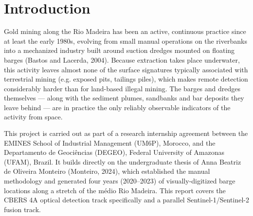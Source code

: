 \documentclass[11pt,a4paper]{article}
\begin{document}
\begin{abstract}
This report details the methodology, the diagnostic process behind these
results, and the concrete next steps required before the pipeline can be
considered a reliable detection tool.

\end{abstract}


\section{Introduction}

Gold mining along the Rio Madeira has been an active, continuous practice
since at least the early 1980s, evolving from small manual operations on the
riverbanks into a mechanized industry built around suction dredges mounted on
floating barges (Bastos and Lacerda, 2004). Because extraction takes place
underwater, this activity leaves almost none of the surface signatures
typically associated with terrestrial mining (e.g. exposed pits, tailings
piles), which makes remote detection considerably harder than for land-based
illegal mining. The barges and dredges themselves --- along with the sediment
plumes, sandbanks and bar deposits they leave behind --- are in practice the
only reliably observable indicators of the activity from space.

This project is carried out as part of a research internship agreement
between the EMINES School of Industrial Management (UM6P), Morocco, and the
Departamento de Geoci\^encias (DEGEO), Federal University of Amazonas
(UFAM), Brazil. It builds directly on the undergraduate thesis of Anna
Beatriz de Oliveira Monteiro (Monteiro, 2024), which established the manual
methodology and generated four years (2020--2023) of visually-digitized barge
locations along a stretch of the m\'edio Rio Madeira. This report covers the
CBERS 4A optical detection track specifically and a parallel Sentinel-1/Sentinel-2
fusion track.
\end{document}
